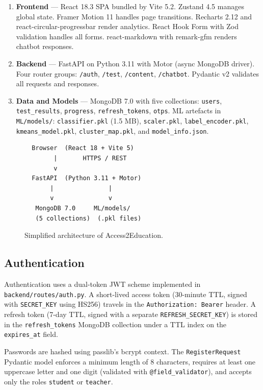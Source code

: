 \documentclass[12pt,a4paper]{article}
\begin{document}
\begin{enumerate}[leftmargin=*,label=\textbf{Tier \arabic*:}]
  \item \textbf{Frontend} --- React 18.3 SPA bundled by Vite 5.2.
    Zustand 4.5 manages global state. Framer Motion 11 handles
    page transitions. Recharts 2.12 and react-circular-progressbar
    render analytics. React Hook Form with Zod validation handles
    all forms. react-markdown with remark-gfm renders chatbot
    responses.
  \item \textbf{Backend} --- FastAPI on Python 3.11 with Motor
    (async MongoDB driver). Four router groups:
    \texttt{/auth}, \texttt{/test}, \texttt{/content},
    \texttt{/chatbot}. Pydantic v2 validates all requests and
    responses.
  \item \textbf{Data and Models} --- MongoDB 7.0 with five
    collections: \texttt{users}, \texttt{test\_results},
    \texttt{progress}, \texttt{refresh\_tokens}, \texttt{otps}.
    ML artefacts in \texttt{ML/models/}: \texttt{classifier.pkl}
    (1.5 MB), \texttt{scaler.pkl}, \texttt{label\_encoder.pkl},
    \texttt{kmeans\_model.pkl}, \texttt{cluster\_map.pkl}, and
    \texttt{model\_info.json}.
\end{enumerate}

\begin{figure}[H]
  \centering
  \begin{verbatim}
  Browser  (React 18 + Vite 5)
        |       HTTPS / REST
        v
  FastAPI  (Python 3.11 + Motor)
       |               |
       v               v
   MongoDB 7.0     ML/models/
   (5 collections)  (.pkl files)
  \end{verbatim}
  \caption{Simplified architecture of Access2Education.}
\end{figure}

\subsection{Authentication}

Authentication uses a dual-token JWT scheme implemented in
\texttt{backend/routes/auth.py}. A short-lived access token
(30-minute TTL, signed with \texttt{SECRET\_KEY} using HS256)
travels in the \texttt{Authorization: Bearer} header. A refresh
token (7-day TTL, signed with a separate \texttt{REFRESH\_SECRET\_KEY})
is stored in the \texttt{refresh\_tokens} MongoDB collection under
a TTL index on the \texttt{expires\_at} field.

Passwords are hashed using passlib's bcrypt context. The
\texttt{RegisterRequest} Pydantic model enforces a minimum length
of 8 characters, requires at least one uppercase letter and one
digit (validated with \texttt{@field\_validator}), and accepts only
the roles \texttt{student} or \texttt{teacher}.
\end{document}
